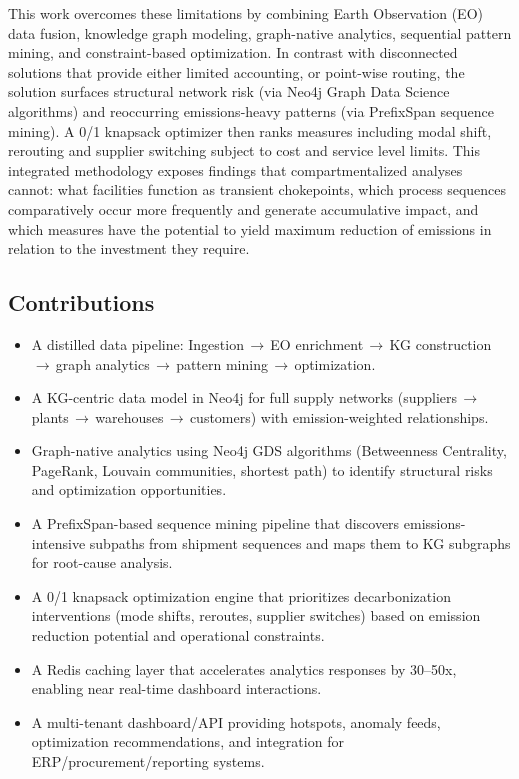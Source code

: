 \documentclass[conference]{IEEEtran}
\begin{document}
This work overcomes these limitations by combining Earth Observation (EO) data fusion, knowledge graph modeling, graph-native analytics, sequential pattern mining, and constraint-based optimization. In contrast with disconnected solutions that provide either limited accounting, or point-wise routing, the solution surfaces structural network risk (via Neo4j Graph Data Science algorithms) and reoccurring emissions-heavy patterns (via PrefixSpan sequence mining). A 0/1 knapsack optimizer then ranks measures including modal shift, rerouting and supplier switching subject to cost and service level limits. This integrated methodology exposes findings that compartmentalized analyses cannot: what facilities function as transient chokepoints, which process sequences comparatively occur more frequently and generate accumulative impact, and which measures have the potential to yield maximum reduction of emissions in relation to the investment they require.

\subsection{Contributions}
\begin{itemize}
  \item A distilled data pipeline: Ingestion\,$\to$\,EO enrichment\,$\to$\,KG construction\,$\to$\,graph analytics\,$\to$\,pattern mining\,$\to$\,optimization.
  \item A KG-centric data model in Neo4j for full supply networks (suppliers\,$\to$\,plants\,$\to$\,warehouses\,$\to$\,customers) with emission-weighted relationships.
  \item Graph-native analytics using Neo4j GDS algorithms (Betweenness Centrality, PageRank, Louvain communities, shortest path) to identify structural risks and optimization opportunities.
  \item A PrefixSpan-based sequence mining pipeline that discovers emissions-intensive subpaths from shipment sequences and maps them to KG subgraphs for root-cause analysis.
  \item A 0/1 knapsack optimization engine that prioritizes decarbonization interventions (mode shifts, reroutes, supplier switches) based on emission reduction potential and operational constraints.
  \item A Redis caching layer that accelerates analytics responses by 30--50x, enabling near real-time dashboard interactions.
  \item A multi-tenant dashboard/API providing hotspots, anomaly feeds, optimization recommendations, and integration for ERP/procurement/reporting systems.
\end{itemize}
\end{document}
